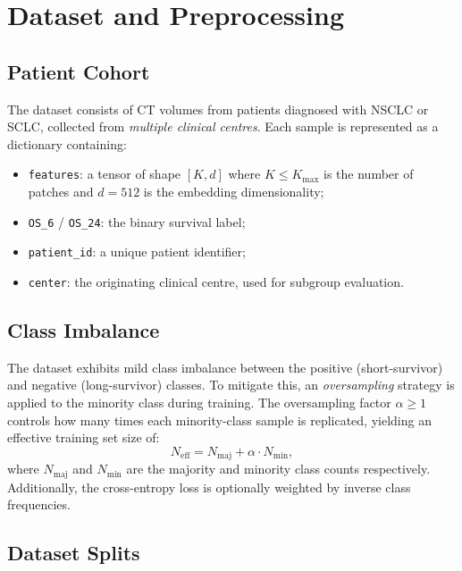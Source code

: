 \documentclass[11pt,a4paper]{article}
\begin{document}
\section{Dataset and Preprocessing}
\label{sec:data}

\subsection{Patient Cohort}

The dataset consists of CT volumes from patients diagnosed with NSCLC or SCLC,
collected from \emph{multiple clinical centres}. Each sample is represented as a
dictionary containing:
\begin{itemize}
  \item \texttt{features}: a tensor of shape $[K, d]$ where $K \leq K_{\max}$ is the
        number of patches and $d = 512$ is the embedding dimensionality;
  \item \texttt{OS\_6} / \texttt{OS\_24}: the binary survival label;
  \item \texttt{patient\_id}: a unique patient identifier;
  \item \texttt{center}: the originating clinical centre, used for subgroup evaluation.
\end{itemize}

\subsection{Class Imbalance}

The dataset exhibits mild class imbalance between the positive (short-survivor) and
negative (long-survivor) classes. To mitigate this, an \emph{oversampling} strategy
is applied to the minority class during training. The oversampling factor
$\alpha \geq 1$ controls how many times each minority-class sample is replicated,
yielding an effective training set size of:
\begin{equation}
  N_{\text{eff}} = N_{\text{maj}} + \alpha \cdot N_{\text{min}},
\end{equation}
where $N_{\text{maj}}$ and $N_{\text{min}}$ are the majority and minority class
counts respectively. Additionally, the cross-entropy loss is optionally weighted
by inverse class frequencies.

\subsection{Dataset Splits}
\end{document}
